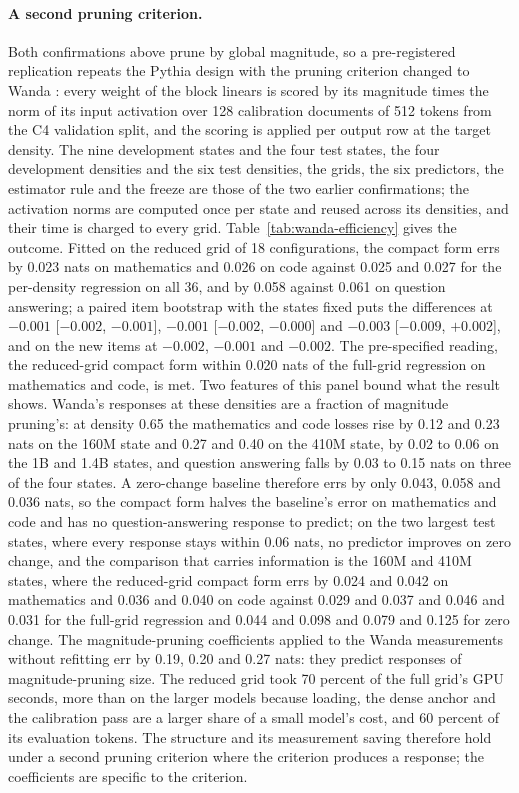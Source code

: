 \paragraph{A second pruning criterion.} Both confirmations above prune by global magnitude, so a
pre-registered replication repeats the Pythia design with the pruning criterion changed to Wanda
\citep{sun2023simple}: every weight of the block linears is scored by its magnitude times the norm of
its input activation over 128 calibration documents of 512 tokens from the C4 validation split, and
the scoring is applied per output row at the target density. The nine development states and the four
test states, the four development densities and the six test densities, the grids, the six predictors,
the estimator rule and the freeze are those of the two earlier confirmations; the activation norms
are computed once per state and reused across its densities, and their time is charged to every grid.
Table~\ref{tab:wanda-efficiency} gives the outcome. Fitted on the reduced grid of 18 configurations,
the compact form errs by 0.023 nats on mathematics and 0.026 on code against 0.025 and 0.027 for the
per-density regression on all 36, and by 0.058 against 0.061 on question answering; a paired item
bootstrap with the states fixed puts the differences at $-0.001$ [$-0.002$, $-0.001$], $-0.001$
[$-0.002$, $-0.000$] and $-0.003$ [$-0.009$, $+0.002$], and on the new items at $-0.002$, $-0.001$ and
$-0.002$. The pre-specified reading, the reduced-grid compact form within 0.020 nats of the full-grid
regression on mathematics and code, is met. Two features of this panel bound what the result shows.
Wanda's responses at these densities are a fraction of magnitude pruning's: at density 0.65 the
mathematics and code losses rise by 0.12 and 0.23 nats on the 160M state and 0.27 and 0.40 on the 410M
state, by 0.02 to 0.06 on the 1B and 1.4B states, and question answering falls by 0.03 to 0.15 nats
on three of the four states. A zero-change baseline therefore errs by only 0.043, 0.058 and 0.036 nats,
so the compact form halves the baseline's error on mathematics and code and has no question-answering
response to predict; on the two largest test states, where every response stays within 0.06 nats,
no predictor improves on zero change, and the comparison that carries information is the 160M and
410M states, where the reduced-grid compact form errs by 0.024 and 0.042 on mathematics and 0.036 and
0.040 on code against 0.029 and 0.037 and 0.046 and 0.031 for the full-grid regression and 0.044 and
0.098 and 0.079 and 0.125 for zero change. The magnitude-pruning coefficients applied to the Wanda
measurements without refitting err by 0.19, 0.20 and 0.27 nats: they predict responses of
magnitude-pruning size. The reduced grid took 70 percent of the full grid's GPU seconds, more than on
the larger models because loading, the dense anchor and the calibration pass are a larger share of a
small model's cost, and 60 percent of its evaluation tokens. The structure and its measurement saving
therefore hold under a second pruning criterion where the criterion produces a response; the
coefficients are specific to the criterion.


